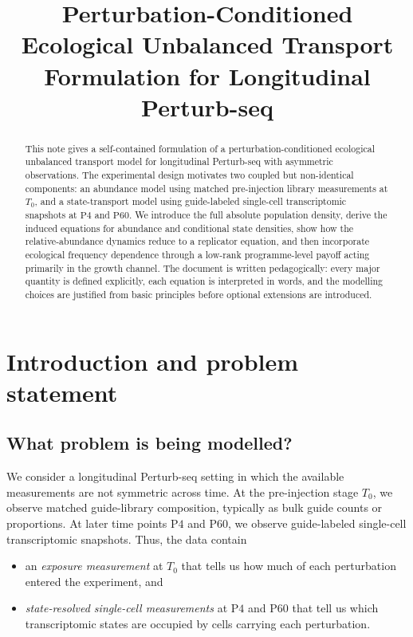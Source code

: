 \documentclass[11pt]{article}
\title{Perturbation-Conditioned Ecological Unbalanced Transport Formulation for Longitudinal Perturb-seq}
\author{}
\date{}
\newcommand{\1}{\mathbf{1}}
\newcommand{\Tzero}{T_0}
\newcommand{\Pfour}{\mathrm{P4}}
\newcommand{\Psixty}{\mathrm{P60}}
\theoremstyle{plain}
\begin{document}
\maketitle

\begin{abstract}
This note gives a self-contained formulation of a perturbation-conditioned ecological unbalanced transport model for longitudinal Perturb-seq with asymmetric observations. The experimental design motivates two coupled but non-identical components: an abundance model using matched pre-injection library measurements at $\Tzero$, and a state-transport model using guide-labeled single-cell transcriptomic snapshots at $\Pfour$ and $\Psixty$. We introduce the full absolute population density, derive the induced equations for abundance and conditional state densities, show how the relative-abundance dynamics reduce to a replicator equation, and then incorporate ecological frequency dependence through a low-rank programme-level payoff acting primarily in the growth channel. The document is written pedagogically: every major quantity is defined explicitly, each equation is interpreted in words, and the modelling choices are justified from basic principles before optional extensions are introduced.
\end{abstract}

\tableofcontents

\section{Introduction and problem statement}

\subsection{What problem is being modelled?}

We consider a longitudinal Perturb-seq setting in which the available measurements are not symmetric across time. At the pre-injection stage $\Tzero$, we observe matched guide-library composition, typically as bulk guide counts or proportions. At later time points $\Pfour$ and $\Psixty$, we observe guide-labeled single-cell transcriptomic snapshots. Thus, the data contain
\begin{itemize}
    \item an \emph{exposure measurement} at $\Tzero$ that tells us how much of each perturbation entered the experiment, and
    \item \emph{state-resolved single-cell measurements} at $\Pfour$ and $\Psixty$ that tell us which transcriptomic states are occupied by cells carrying each perturbation.
\end{itemize}
\end{document}
